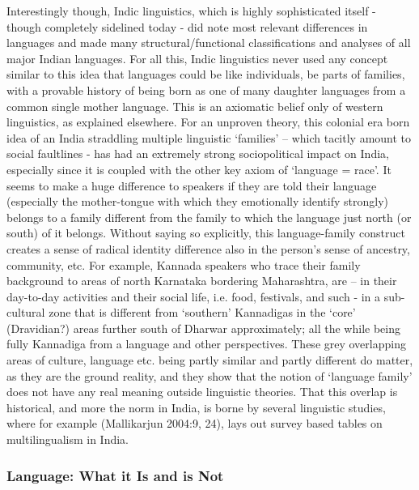 Interestingly though, Indic linguistics, which is highly sophisticated itself - though completely sidelined today - did note most relevant differences in languages and made many structural/functional classifications and analyses of all major Indian languages. For all this, Indic linguistics never used any concept similar to this idea that languages could be like individuals, be parts of families, with a provable history of being born as one of many daughter languages from a common single mother language. This is an axiomatic belief only of western linguistics, as explained elsewhere. For an unproven theory, this colonial era born idea of an India straddling multiple linguistic ‘families’ – which tacitly amount to social faultlines - has had an extremely strong sociopolitical impact on India, especially since it is coupled with the other key axiom of ‘language = race’. It seems to make a huge difference to speakers if they are told their language (especially the mother-tongue with which they emotionally identify strongly) belongs to a family different from the family to which the language just north (or south) of it belongs. Without saying so explicitly, this language-family construct creates a sense of radical identity difference also in the person’s sense of ancestry, community, etc. For example, Kannada speakers who trace their family background to areas of north Karnataka bordering Maharashtra, are – in their day-to-day activities and their social life, i.e. food, festivals, and such - in a sub-cultural zone that is different from ‘southern’ Kannadigas in the ‘core’ (Dravidian?) areas further south of Dharwar approximately; all the while being fully Kannadiga from a language and other perspectives. These grey overlapping areas of culture, language etc. being partly similar and partly different do matter, as they are the ground reality, and they show that the notion of ‘language family’ does not have any real meaning outside linguistic theories. That this overlap is historical, and more the norm in India, is borne by several linguistic studies, where for example (Mallikarjun 2004:9, 24), lays out survey based tables on multilingualism in India.


\subsubsection*{Language: What it Is and is Not}

\vskip -8pt

